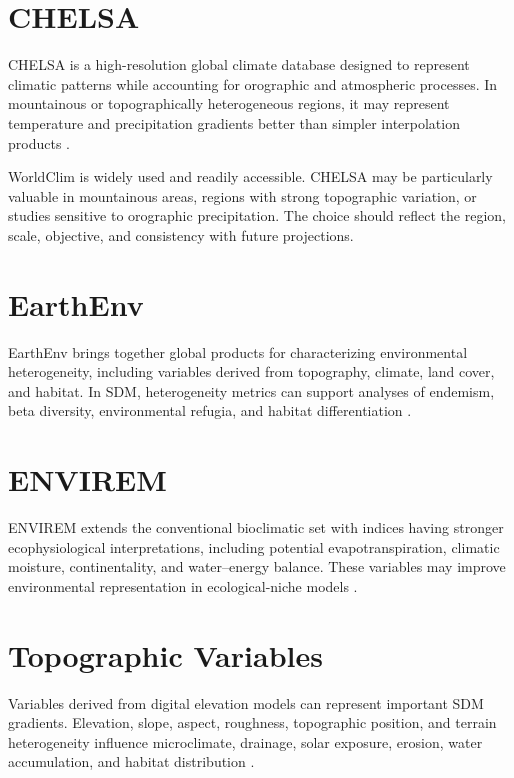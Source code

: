 \section{CHELSA}

CHELSA is a high-resolution global climate database designed to represent
climatic patterns while accounting for orographic and atmospheric processes.
In mountainous or topographically heterogeneous regions, it may represent
temperature and precipitation gradients better than simpler interpolation
products \parencite{karger2017chelsa}.

\begin{dica}[title={\faLightbulb\quad WorldClim or CHELSA?}]
WorldClim is widely used and readily accessible. CHELSA may be particularly
valuable in mountainous areas, regions with strong topographic variation, or
studies sensitive to orographic precipitation. The choice should reflect the
region, scale, objective, and consistency with future projections.
\end{dica}

\section{EarthEnv}

EarthEnv brings together global products for characterizing environmental
heterogeneity, including variables derived from topography, climate, land
cover, and habitat. In SDM, heterogeneity metrics can support analyses of
endemism, beta diversity, environmental refugia, and habitat differentiation
\parencite{amatulli2018data}.

\section{ENVIREM}

ENVIREM extends the conventional bioclimatic set with indices having stronger
ecophysiological interpretations, including potential evapotranspiration,
climatic moisture, continentality, and water--energy balance. These variables
may improve environmental representation in ecological-niche models
\parencite{title2018envirem}.

\section{Topographic Variables}

Variables derived from digital elevation models can represent important SDM
gradients. Elevation, slope, aspect, roughness, topographic position, and terrain
heterogeneity influence microclimate, drainage, solar exposure, erosion, water
accumulation, and habitat distribution \parencite{farr2007srtm}.

